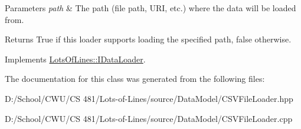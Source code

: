 \begin{DoxyParams}{Parameters}
{\em path} & The path (file path, U\+RI, etc.) where the data will be loaded from. \\
\hline
\end{DoxyParams}
\begin{DoxyReturn}{Returns}
True if this loader supports loading the specified path, false otherwise. 
\end{DoxyReturn}


Implements \hyperlink{class_lots_of_lines_1_1_i_data_loader_a73f9ee96a55bd6d339d5028f951240f9}{Lots\+Of\+Lines\+::\+I\+Data\+Loader}.



The documentation for this class was generated from the following files\+:\begin{DoxyCompactItemize}
\item 
D\+:/\+School/\+C\+W\+U/\+C\+S 481/\+Lots-\/of-\/\+Lines/source/\+Data\+Model/C\+S\+V\+File\+Loader.\+hpp\item 
D\+:/\+School/\+C\+W\+U/\+C\+S 481/\+Lots-\/of-\/\+Lines/source/\+Data\+Model/C\+S\+V\+File\+Loader.\+cpp\end{DoxyCompactItemize}
